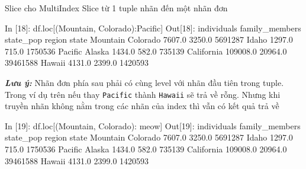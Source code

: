 \documentclass[
]{book}
\makeatletter
\newenvironment{Shaded}{\begin{snugshade}}{\end{snugshade}}
\newcommand{\DecValTok}[1]{\textcolor[rgb]{0.00,0.00,0.81}{#1}}
\newcommand{\FloatTok}[1]{\textcolor[rgb]{0.00,0.00,0.81}{#1}}
\newcommand{\NormalTok}[1]{#1}
\newcommand{\StringTok}[1]{\textcolor[rgb]{0.31,0.60,0.02}{#1}}
\newenvironment{kframe}{%
\medskip{}
\setlength{\fboxsep}{.8em}
 \def\at@end@of@kframe{}%
 \ifinner\ifhmode%
  \def\at@end@of@kframe{\end{minipage}}%
  \begin{minipage}{\columnwidth}%
 \fi\fi%
 \def\FrameCommand##1{\hskip\@totalleftmargin \hskip-\fboxsep
 \colorbox{shadecolor}{##1}\hskip-\fboxsep
     \hskip-\linewidth \hskip-\@totalleftmargin \hskip\columnwidth}%
 \MakeFramed {\advance\hsize-\width
   \@totalleftmargin\z@ \linewidth\hsize
   \@setminipage}}%
 {\par\unskip\endMakeFramed%
 \at@end@of@kframe}
\newenvironment{rmdblock}[1]
  {
  \begin{itemize}
  \renewcommand{\labelitemi}{
    \raisebox{-.7\height}[0pt][0pt]{
      {\setkeys{Gin}{width=3em,keepaspectratio}\texttt{[image: images/\#1]}}
    }
  }
  \setlength{\fboxsep}{1em}
  \begin{kframe}
  \item
  }
  {
  \end{kframe}
  \end{itemize}
  }
\newenvironment{rmdnote}
  {\begin{rmdblock}{note}}
  {\end{rmdblock}}
\makeatother
\begin{document}
Slice cho MultiIndex
Slice từ 1 tuple nhãn đến một nhãn đơn

\begin{Shaded}
\begin{Highlighting}[]
\NormalTok{In [}\DecValTok{18}\NormalTok{]: df.loc[(}\StringTok{\textquotesingle{}Mountain\textquotesingle{}}\NormalTok{, }\StringTok{\textquotesingle{}Colorado\textquotesingle{}}\NormalTok{):}\StringTok{\textquotesingle{}Pacific\textquotesingle{}}\NormalTok{]}
\NormalTok{Out[}\DecValTok{18}\NormalTok{]:}
\NormalTok{                     individuals  family\_members  state\_pop}
\NormalTok{region   state                                             }
\NormalTok{Mountain Colorado         }\FloatTok{7607.0}          \FloatTok{3250.0}    \DecValTok{5691287}
\NormalTok{         Idaho            }\FloatTok{1297.0}           \FloatTok{715.0}    \DecValTok{1750536}
\NormalTok{Pacific  Alaska           }\FloatTok{1434.0}           \FloatTok{582.0}     \DecValTok{735139}
\NormalTok{         California     }\FloatTok{109008.0}         \FloatTok{20964.0}   \DecValTok{39461588}
\NormalTok{         Hawaii           }\FloatTok{4131.0}          \FloatTok{2399.0}    \DecValTok{1420593}
\end{Highlighting}
\end{Shaded}

\begin{rmdnote}
\textbf{\emph{Lưu ý:}}
Nhãn đơn phía sau phải có cùng level với nhãn đầu tiên trong tuple. Trong ví dụ trên nếu thay \texttt{Pacific} thành \texttt{Hawaii} sẽ trả về rỗng. Nhưng khi truyền nhãn không nằm trong các nhãn của index thì vẫn có kết quả trả về
\end{rmdnote}

\begin{Shaded}
\begin{Highlighting}[]
\NormalTok{In [}\DecValTok{19}\NormalTok{]: df.loc[(}\StringTok{\textquotesingle{}Mountain\textquotesingle{}}\NormalTok{, }\StringTok{\textquotesingle{}Colorado\textquotesingle{}}\NormalTok{): }\StringTok{\textquotesingle{}meow\textquotesingle{}}\NormalTok{]}
\NormalTok{Out[}\DecValTok{19}\NormalTok{]:}
\NormalTok{                     individuals  family\_members  state\_pop}
\NormalTok{region   state                                             }
\NormalTok{Mountain Colorado         }\FloatTok{7607.0}          \FloatTok{3250.0}    \DecValTok{5691287}
\NormalTok{         Idaho            }\FloatTok{1297.0}           \FloatTok{715.0}    \DecValTok{1750536}
\NormalTok{Pacific  Alaska           }\FloatTok{1434.0}           \FloatTok{582.0}     \DecValTok{735139}
\NormalTok{         California     }\FloatTok{109008.0}         \FloatTok{20964.0}   \DecValTok{39461588}
\NormalTok{         Hawaii           }\FloatTok{4131.0}          \FloatTok{2399.0}    \DecValTok{1420593}
\end{Highlighting}
\end{Shaded}
\end{document}
